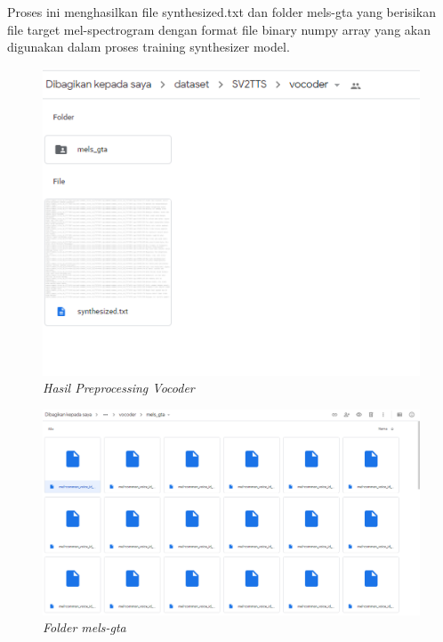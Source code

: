 \begin{enumerate}
Proses ini menghasilkan file synthesized.txt dan folder mels-gta yang berisikan file target mel-spectrogram dengan format file binary numpy array yang akan digunakan dalam proses training synthesizer model.
\begin{figure}[H]
    \centering
    \includegraphics[scale=0.65]{figures/hasil25}
    \caption{\textit{Hasil Preprocessing Vocoder}}
    \label{hasil25}
\end{figure}

\begin{figure}[H]
    \centering
    \includegraphics[scale=0.35]{figures/hasil26}
    \caption{\textit{Folder mels-gta}}
    \label{hasil26}
\end{figure}


\end{enumerate}
